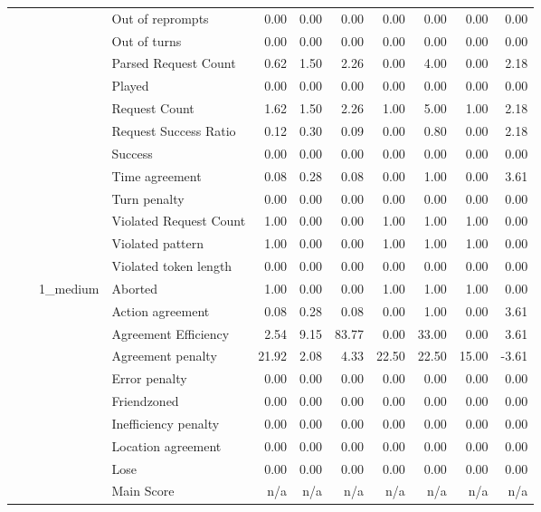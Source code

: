 \begin{tabular}{llllrrrrrrr}
 &  &  & Out of reprompts & 0.00 & 0.00 & 0.00 & 0.00 & 0.00 & 0.00 & 0.00 \\
 &  &  & Out of turns & 0.00 & 0.00 & 0.00 & 0.00 & 0.00 & 0.00 & 0.00 \\
 &  &  & Parsed Request Count & 0.62 & 1.50 & 2.26 & 0.00 & 4.00 & 0.00 & 2.18 \\
 &  &  & Played & 0.00 & 0.00 & 0.00 & 0.00 & 0.00 & 0.00 & 0.00 \\
 &  &  & Request Count & 1.62 & 1.50 & 2.26 & 1.00 & 5.00 & 1.00 & 2.18 \\
 &  &  & Request Success Ratio & 0.12 & 0.30 & 0.09 & 0.00 & 0.80 & 0.00 & 2.18 \\
 &  &  & Success & 0.00 & 0.00 & 0.00 & 0.00 & 0.00 & 0.00 & 0.00 \\
 &  &  & Time agreement & 0.08 & 0.28 & 0.08 & 0.00 & 1.00 & 0.00 & 3.61 \\
 &  &  & Turn penalty & 0.00 & 0.00 & 0.00 & 0.00 & 0.00 & 0.00 & 0.00 \\
 &  &  & Violated Request Count & 1.00 & 0.00 & 0.00 & 1.00 & 1.00 & 1.00 & 0.00 \\
 &  &  & Violated pattern & 1.00 & 0.00 & 0.00 & 1.00 & 1.00 & 1.00 & 0.00 \\
 &  &  & Violated token length & 0.00 & 0.00 & 0.00 & 0.00 & 0.00 & 0.00 & 0.00 \\
\cline{3-11}
 &  & \multirow[t]{27}{*}{1_medium} & Aborted & 1.00 & 0.00 & 0.00 & 1.00 & 1.00 & 1.00 & 0.00 \\
 &  &  & Action agreement & 0.08 & 0.28 & 0.08 & 0.00 & 1.00 & 0.00 & 3.61 \\
 &  &  & Agreement Efficiency & 2.54 & 9.15 & 83.77 & 0.00 & 33.00 & 0.00 & 3.61 \\
 &  &  & Agreement penalty & 21.92 & 2.08 & 4.33 & 22.50 & 22.50 & 15.00 & -3.61 \\
 &  &  & Error penalty & 0.00 & 0.00 & 0.00 & 0.00 & 0.00 & 0.00 & 0.00 \\
 &  &  & Friendzoned & 0.00 & 0.00 & 0.00 & 0.00 & 0.00 & 0.00 & 0.00 \\
 &  &  & Inefficiency penalty & 0.00 & 0.00 & 0.00 & 0.00 & 0.00 & 0.00 & 0.00 \\
 &  &  & Location agreement & 0.00 & 0.00 & 0.00 & 0.00 & 0.00 & 0.00 & 0.00 \\
 &  &  & Lose & 0.00 & 0.00 & 0.00 & 0.00 & 0.00 & 0.00 & 0.00 \\
 &  &  & Main Score & n/a & n/a & n/a & n/a & n/a & n/a & n/a \\

\end{tabular}
